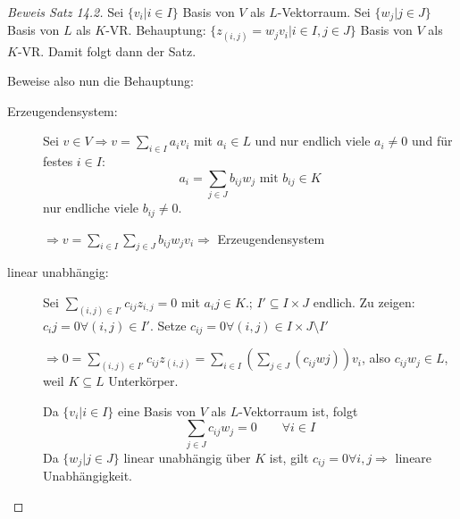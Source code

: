 \documentclass[12pt,a4paper]{scrartcl}
\begin{document}
\begin{proof}[Beweis Satz 14.2] %
	Sei $\{v_i|i\in I\}$ Basis von $V$ als $L$-Vektorraum. Sei $\{w_j|j\in J\}$ Basis von $L$ als $K$-VR. Behauptung: $\{z_{(i,j)} = w_jv_i|i\in I, j\in J\}$ Basis von $V$ als $K$-VR. Damit folgt dann der Satz.
	
	\noindent
	Beweise also nun die Behauptung:
	\begin{description}
		\item[Erzeugendensystem:] Sei $v\in V\Rightarrow v = \sum_{i\in I} a_iv_i$ mit $a_i\in L$ und nur endlich viele $a_i\neq 0$ und für festes $i\in I$:
		$$a_i = \sum_{j\in J}b_{ij}w_j \text{ mit } b_{ij}\in K$$
		nur endliche viele $b_{ij}\neq 0$.
		
		$\Rightarrow v = \sum_{i\in I}\sum_{j\in J}b_{ij}w_jv_i\Rightarrow $ Erzeugendensystem
		\item[linear unabhängig:] Sei $\sum_{(i,j)\in I'}c_{ij}z_{i,j} = 0$ mit $a_ij\in K$.; $I'\subseteq I \times J$ endlich. Zu zeigen: $c_ij = 0 \forall (i,j)\in I'$. Setze $c_{ij} = 0 \forall (i,j)\in I\times J \setminus I'$
		
		$\Rightarrow 0 = \sum_{(i,j)\in I'}c_{ij}z_{(i,j)} = \sum_{i\in I}(\sum_{j\in J}(c_{ij}wj))v_i$, also $c_{ij}w_j\in L$, weil $K\subseteq L$ Unterkörper.
		
		Da $\{v_i|i\in I\}$ eine Basis von $V$ als $L$-Vektorraum ist, folgt
		$$\sum_{j\in J}c_{ij}w_j = 0 \qquad \forall i \in I$$
		Da $\{w_j|j\in J\}$ linear unabhängig über $K$ ist, gilt $c_{ij} = 0\forall i,j\Rightarrow $ lineare Unabhängigkeit.
	\end{description}
\end{proof}
\end{document}
